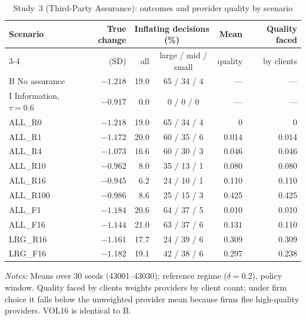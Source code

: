 \documentclass[11pt]{article}
\begin{document}
\begin{table}[t]
\centering
\small
\begin{threeparttable}
\caption{Study~3 (Third-Party Assurance): outcomes and provider quality by scenario}
\label{tab:assurance_describe}
\begin{tabular}{@{}lrrcrr@{}}
\toprule
Scenario & True change & \multicolumn{2}{c}{Inflating decisions (\%)} & Mean & Quality faced \\
\cmidrule(lr){3-4}
 & (SD) & all & large / mid / small & quality & by clients \\
\midrule
B No assurance & $-1.218$ & 19.0 & 65 / 34 / 4 & --- & --- \\
I Information, $\tau = 0.6$ & $-0.917$ & 0.0 & 0 / 0 / 0 & --- & --- \\
ALL\_R0 & $-1.218$ & 19.0 & 65 / 34 / 4 & 0 & 0 \\
ALL\_R1 & $-1.172$ & 20.0 & 60 / 35 / 6 & 0.014 & 0.014 \\
ALL\_R4 & $-1.073$ & 16.6 & 60 / 30 / 3 & 0.046 & 0.046 \\
ALL\_R10 & $-0.962$ & 8.0 & 35 / 13 / 1 & 0.080 & 0.080 \\
ALL\_R16 & $-0.945$ & 6.2 & 24 / 10 / 1 & 0.110 & 0.110 \\
ALL\_R100 & $-0.986$ & 8.6 & 25 / 15 / 3 & 0.425 & 0.425 \\
ALL\_F1 & $-1.184$ & 20.6 & 64 / 37 / 5 & 0.010 & 0.010 \\
ALL\_F16 & $-1.144$ & 21.0 & 63 / 37 / 6 & 0.131 & 0.110 \\
LRG\_R16 & $-1.161$ & 17.7 & 24 / 39 / 6 & 0.309 & 0.309 \\
LRG\_F16 & $-1.182$ & 19.1 & 42 / 38 / 6 & 0.297 & 0.238 \\
\bottomrule
\end{tabular}
\begin{tablenotes}[flushleft]\footnotesize
\item \textit{Notes:} Means over 30 seeds (43001--43030); reference regime ($\delta = 0.2$), policy window. Quality faced by clients weights providers by client count; under firm choice it falls below the unweighted provider mean because firms flee high-quality providers. VOL16 is identical to B.
\end{tablenotes}
\end{threeparttable}
\end{table}
\end{document}
